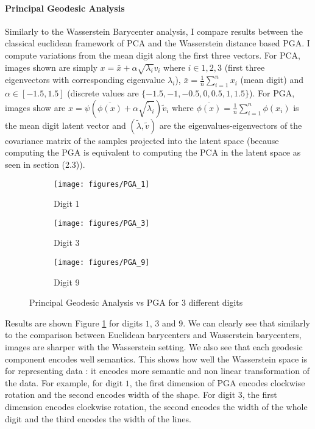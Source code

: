 \documentclass{article}
\begin{document}
\paragraph{Principal Geodesic Analysis} Similarly to the Wasserstein Barycenter analysis, I compare results between the classical euclidean framework of PCA and the Wasserstein distance based PGA. I compute variations from the mean digit along the first three vectors. For PCA, images shown are simply $x = \bar{x} + \alpha \sqrt{\lambda_i} v_i$ where $i \in {1, 2, 3}$ (first three eigenvectors with corresponding eigenvalue $\lambda_i$), $\bar{x} = \frac{1}{n} \sum_{i=1}^{n} x_i$ (mean digit) and $\alpha \in [-1.5, 1.5]$ (discrete values are $\{ -1.5, -1, -0.5, 0, 0.5, 1, 1.5\}$). For PGA, images show are $x = \psi(\overline{\phi(x)} + \alpha \sqrt{\tilde{\lambda}_i}) \tilde{v}_i$ where $\overline{\phi(x)} = \frac{1}{n} \sum_{i=1}^{n} \phi(x_i)$ is the mean digit latent vector and $(\tilde{\lambda}, \tilde{v})$ are the eigenvalues-eigenvectors of the covariance matrix of the samples projected into the latent space (because computing the PGA is equivalent to computing the PCA in the latent space as seen in section (2.3)).


\begin{figure}[!htb]
	\centering
	\begin{subfigure}{.33\textwidth}
		\centering \texttt{[image: figures/PGA\_1]}
		\caption{Digit 1}
	\end{subfigure}%
	\begin{subfigure}{.33\textwidth}
		\centering \texttt{[image: figures/PGA\_3]}
		\caption{Digit 3}
	\end{subfigure}%
	\begin{subfigure}{.33\textwidth}
		\centering \texttt{[image: figures/PGA\_9]}
		\caption{Digit 9}
	\end{subfigure}
	\caption{Principal Geodesic Analysis vs PGA for $3$ different digits}
	\label{fig:pga}
\end{figure}

Results are shown Figure \ref{fig:pga} for digits $1$, $3$ and $9$. We can clearly see that similarly to the comparison between Euclidean barycenters and Wasserstein barycenters, images are sharper with the Wasserstein setting. We also see that each geodesic component encodes well semantics. This shows how well the Wasserstein space is for representing data : it encodes more semantic and non linear transformation of the data. For example, for digit $1$, the first dimension of PGA encodes clockwise rotation and the second encodes width of the shape. For digit $3$, the first dimension encodes clockwise rotation, the second encodes the width of the whole digit and the third encodes the width of the lines.
\end{document}
